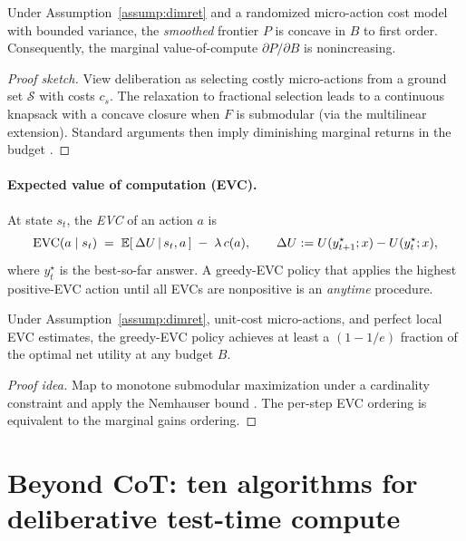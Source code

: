 \begin{proposition}
Under Assumption~\ref{assump:dimret} and a randomized micro-action cost model with bounded variance, the \emph{smoothed} frontier $P$ is concave in $B$ to first order. Consequently, the marginal value-of-compute $\partial P / \partial B$ is nonincreasing.
\end{proposition}

\begin{proof}[Proof sketch]
View deliberation as selecting costly micro-actions from a ground set $\mathcal{S}$ with costs $c_s$. The relaxation to fractional selection leads to a continuous knapsack with a concave closure when $F$ is submodular (via the multilinear extension). Standard arguments then imply diminishing marginal returns in the budget \cite{nemhauser1978,golovin2011adaptive}.
\end{proof}

\paragraph{Expected value of computation (EVC).} At state $s_t$, the \emph{EVC} of an action $a$ is
\begin{equation}
\mathrm{EVC}(a \mid s_t) \;=\; \mathbb{E}\!\left[\, \Delta U \,\middle|\, s_t, a \,\right] \;-\; \lambda\, c(a),
\qquad \Delta U := U(y^\star_{t+1};x)-U(y^\star_{t};x),
\label{eq:evc}
\end{equation}
where $y^\star_t$ is the best-so-far answer. A greedy-EVC policy that applies the highest positive-EVC action until all EVCs are nonpositive is an \emph{anytime} procedure.

\begin{theorem}
\label{thm:greedy}
Under Assumption~\ref{assump:dimret}, unit-cost micro-actions, and perfect local EVC estimates, the greedy-EVC policy achieves at least a $(1-1/e)$ fraction of the optimal net utility at any budget $B$.
\end{theorem}

\begin{proof}[Proof idea]
Map to monotone submodular maximization under a cardinality constraint and apply the Nemhauser bound \cite{nemhauser1978}. The per-step EVC ordering is equivalent to the marginal gains ordering.
\end{proof}

\section{Beyond CoT: ten algorithms for deliberative test-time compute}

